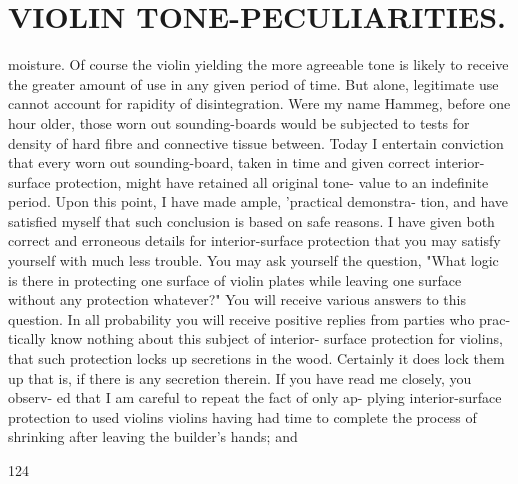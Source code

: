 \documentclass{article}
\begin{document}
\section*{VIOLIN TONE-PECULIARITIES.}
moisture. Of course the violin yielding the more agreeable tone is likely to receive the greater amount of use in any given period of time. But alone, legitimate use cannot account for rapidity of disintegration. Were my name Hammeg, before one hour older, those worn out sounding-boards would be subjected to tests for density of hard fibre and connective tissue between. Today I entertain conviction that every worn out sounding-board, taken in time and given correct interior-surface protection, might have retained all original tone- value to an indefinite period. Upon this point, I have made ample, 'practical demonstra- tion, and have satisfied myself that such conclusion is based on safe reasons. I have given both correct and erroneous details for interior-surface protection that you may satisfy yourself with much less trouble. You may ask yourself the question, "What logic is there in protecting one surface of violin plates while leaving one surface without any protection whatever?" You will receive various answers to this question. In all probability you will receive positive replies from parties who prac- tically know nothing about this subject of interior- surface protection for violins, that such protection locks up secretions in the wood. Certainly it does lock them up that is, if there is any secretion therein. If you have read me closely, you observ- ed that I am careful to repeat the fact of only ap- plying interior-surface protection to used violins violins having had time to complete the process of shrinking after leaving the builder's hands; and

124
\end{document}
